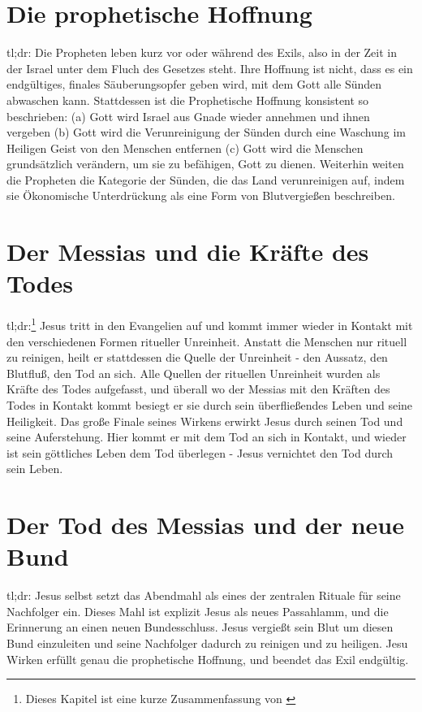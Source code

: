 \chapter{\label{chap:prophetische-hoffnung}Die prophetische Hoffnung}
tl;dr:
Die Propheten leben kurz vor oder während des Exils, also in der Zeit in der Israel unter dem Fluch des Gesetzes steht.
Ihre Hoffnung ist nicht, dass es ein endgültiges, finales Säuberungsopfer geben wird, mit dem Gott alle Sünden abwaschen kann.
Stattdessen ist die Prophetische Hoffnung konsistent so beschrieben:
(a) Gott wird Israel aus Gnade wieder annehmen und ihnen vergeben
(b) Gott wird die Verunreinigung der Sünden durch eine Waschung im Heiligen Geist von den Menschen entfernen
(c) Gott wird die Menschen grundsätzlich verändern, um sie zu befähigen, Gott zu dienen.
Weiterhin weiten die Propheten die Kategorie der Sünden, die das Land verunreinigen auf, indem sie Ökonomische Unterdrückung als eine Form von Blutvergießen beschreiben.


\chapter{Der Messias und die Kräfte des Todes}
tl;dr:\footnote{
Dieses Kapitel ist eine kurze Zusammenfassung von \Cite{jesus-and-the-forces-of-death}}
Jesus tritt in den Evangelien auf und kommt immer wieder in Kontakt mit den verschiedenen Formen ritueller Unreinheit.
Anstatt die Menschen nur rituell zu reinigen, heilt er stattdessen die Quelle der Unreinheit - den Aussatz, den Blutfluß, den Tod an sich.
Alle Quellen der rituellen Unreinheit wurden als Kräfte des Todes aufgefasst, und überall wo der Messias mit den Kräften des Todes in Kontakt kommt besiegt er
sie durch sein überfließendes Leben und seine Heiligkeit.
Das große Finale seines Wirkens erwirkt Jesus durch seinen Tod und seine Auferstehung.
Hier kommt er mit dem Tod an sich in Kontakt, und wieder ist sein göttliches Leben dem Tod überlegen - Jesus vernichtet den Tod durch sein Leben.

\chapter{Der Tod des Messias und der neue Bund}
tl;dr:
Jesus selbst setzt das Abendmahl als eines der zentralen Rituale für seine Nachfolger ein.
Dieses Mahl ist explizit Jesus als neues Passahlamm, und die Erinnerung an einen neuen Bundesschluss.
Jesus vergießt sein Blut um diesen Bund einzuleiten und seine Nachfolger dadurch zu reinigen und zu heiligen.
Jesu Wirken erfüllt genau die prophetische Hoffnung, und beendet das Exil endgültig.

